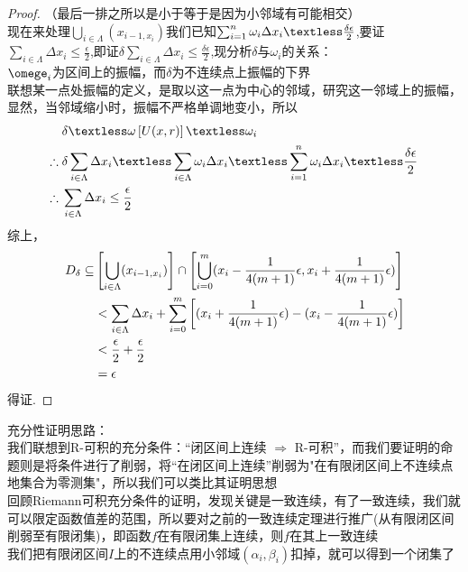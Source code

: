 \documentclass[12pt, a4paper, oneside]{ctexart}
\begin{document}
\begin{proof}
（最后一排之所以是小于等于是因为小邻域有可能相交）\\
现在来处理$\bigcup_{i \in \Lambda}(x_{i-1,x_i})$我们已知$\sum_{i=1}^{n}\omega_i \Delta x_i \textless \frac{\delta \epsilon}{2}$,要证$\sum_{i \in \Lambda }\Delta x_i \leq \frac{\epsilon}{2}$,即证$\delta \sum_{i \in \Lambda }\Delta x_i \leq  \frac{\delta \epsilon}{2}$,现分析$\delta $与$\omega_i$的关系：\\
$\omege_i$为区间上的振幅，而$\delta $为不连续点上振幅的下界\\
联想某一点处振幅的定义，是取以这一点为中心的邻域，研究这一邻域上的振幅，显然，当邻域缩小时，振幅不严格单调地变小，所以
\begin{equation*}
    \begin{aligned}
          &\delta \textless \omega \left[ U(x,r)  \right] \textless \omega_i\\
          \therefore\; &\delta \sum_{i \in \Lambda }\Delta x_i \textless  \sum_{i \in \Lambda }\omega _i \Delta x_i \textless \sum_{i=1 }^{n}\omega _i \Delta x_i \textless \frac{\delta \epsilon}{2}\\
          \therefore \;&\sum_{i \in \Lambda }\Delta x_i \leq \frac{\epsilon}{2}
    \end{aligned}
\end{equation*}
综上，
\begin{equation*}
   \begin{aligned}
          D_{\delta} \subseteq &\left [\bigcup_{i \in \Lambda}(x_{i-1,x_i})\right ] \cap \left [\bigcup_{i=0}^{m}(x_i-\frac{1}{4(m+1)}\epsilon,x_i+\frac{1}{4(m+1)}\epsilon)\right] \\
          &\textless \sum_{i \in \Lambda }\Delta x_i +\sum_{i=0}^{m}\left[(x_i+\frac{1}{4(m+1)}\epsilon)-(x_i-\frac{1}{4(m+1)}\epsilon)\right] \\
          &\textless \frac{\epsilon}{2} +\frac{\epsilon}{2}\\
          &=\epsilon
   \end{aligned}
\end{equation*}
得证.
\end{proof}

\begin{note}
充分性证明思路：\\
我们联想到R-可积的充分条件：“闭区间上连续 $\Rightarrow$  R-可积”，而我们要证明的命题则是将条件进行了削弱，将“在闭区间上连续”削弱为"在有限闭区间上不连续点地集合为零测集"，所以我们可以类比其证明思想\\
回顾Riemann可积充分条件的证明，发现关键是一致连续，有了一致连续，我们就可以限定函数值差的范围，所以要对之前的一致连续定理进行推广(从有限闭区间削弱至有限闭集)，即函数$f$在有限闭集上连续，则$f$在其上一致连续\\
我们把有限闭区间$I$上的不连续点用小邻域$(\alpha_i,\beta_i)$扣掉，就可以得到一个闭集了
\end{note}
\end{document}
